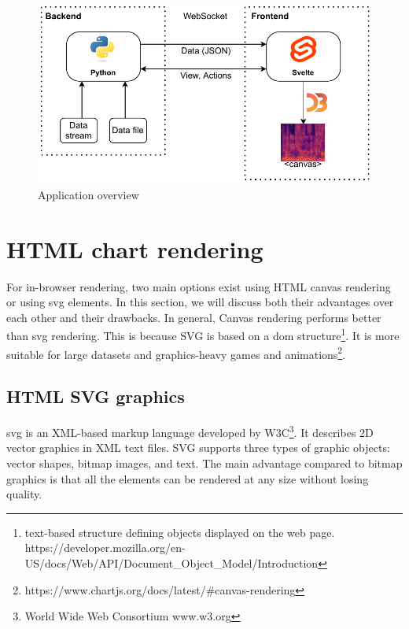 \begin{figure}
    \centering
    \includegraphics{obrazky/appstack.drawio.pdf}
    \caption{Application overview}
    \label{fig:app_overview}
\end{figure}







\section{HTML chart rendering}

For in-browser rendering, two main options exist using HTML canvas rendering or using \ac{svg} elements. In this section, we will discuss both their advantages over each other and their drawbacks. In general, Canvas rendering performs better than \ac{svg} rendering. This is because SVG is based on a \ac{dom} structure\footnote{text-based structure defining objects displayed on the web page. https://developer.mozilla.org/en-US/docs/Web/API/Document\_Object\_Model/Introduction}. It is more suitable for large datasets and graphics-heavy games and animations\footnote{https://www.chartjs.org/docs/latest/\#canvas-rendering}.

\subsection{HTML SVG graphics}

\ac{svg} is an XML-based markup language developed by W3C\footnote{World Wide Web Consortium www.w3.org}. It describes 2D vector graphics in XML text files. SVG supports three types of graphic objects: vector shapes, bitmap images, and text. The main advantage compared to bitmap graphics is that all the elements can be rendered at any size without losing quality. 

